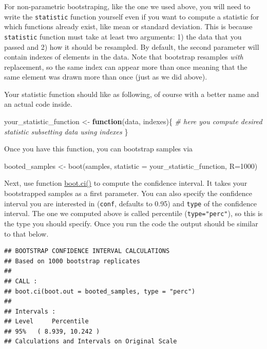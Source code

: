 \documentclass[
]{book}
\newenvironment{Shaded}{\begin{snugshade}}{\end{snugshade}}
\newcommand{\AttributeTok}[1]{\textcolor[rgb]{0.77,0.63,0.00}{#1}}
\newcommand{\CommentTok}[1]{\textcolor[rgb]{0.56,0.35,0.01}{\textit{#1}}}
\newcommand{\ControlFlowTok}[1]{\textcolor[rgb]{0.13,0.29,0.53}{\textbf{#1}}}
\newcommand{\DecValTok}[1]{\textcolor[rgb]{0.00,0.00,0.81}{#1}}
\newcommand{\FunctionTok}[1]{\textcolor[rgb]{0.00,0.00,0.00}{#1}}
\newcommand{\NormalTok}[1]{#1}
\newcommand{\OtherTok}[1]{\textcolor[rgb]{0.56,0.35,0.01}{#1}}
\begin{document}
For non-parametric bootstraping, like the one we used above, you will need to write the \texttt{statistic} function yourself even if you want to compute a statistic for which functions already exist, like mean or standard deviation. This is because \texttt{statistic} function must take at least two arguments: 1) the data that you passed and 2) how it should be resampled. By default, the second parameter will contain indexes of elements in the data. Note that bootstrap resamples \emph{with} replacement, so the same index can appear more than once meaning that the same element was drawn more than once (just as we did above).

Your statistic function should like as following, of course with a better name and an actual code inside.

\begin{Shaded}
\begin{Highlighting}[]
\NormalTok{your\_statistic\_function }\OtherTok{\textless{}{-}} \ControlFlowTok{function}\NormalTok{(data, indexes)\{}
  \CommentTok{\# here you compute desired statistic subsetting data using indexes}
\NormalTok{\}}
\end{Highlighting}
\end{Shaded}

Once you have this function, you can bootstrap samples via

\begin{Shaded}
\begin{Highlighting}[]
\NormalTok{booted\_samples }\OtherTok{\textless{}{-}} \FunctionTok{boot}\NormalTok{(samples, }\AttributeTok{statistic =}\NormalTok{ your\_statistic\_function, }\AttributeTok{R=}\DecValTok{1000}\NormalTok{)}
\end{Highlighting}
\end{Shaded}

Next, use function \href{https://stat.ethz.ch/R-manual/R-devel/library/boot/html/boot.html}{boot.ci()} to compute the confidence interval. It takes your bootstrapped samples as a first parameter. You can also specify the confidence interval you are interested in (\texttt{conf}, defaults to 0.95) and \texttt{type} of the confidence interval. The one we computed above is called percentile (\texttt{type="perc"}), so this is the type you should specify. Once you run the code the output should be similar to that below.

\begin{verbatim}
## BOOTSTRAP CONFIDENCE INTERVAL CALCULATIONS
## Based on 1000 bootstrap replicates
## 
## CALL : 
## boot.ci(boot.out = booted_samples, type = "perc")
## 
## Intervals : 
## Level     Percentile     
## 95%   ( 8.939, 10.242 )  
## Calculations and Intervals on Original Scale
\end{verbatim}
\end{document}

